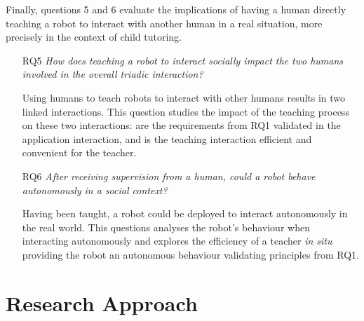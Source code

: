 Finally, questions 5 and 6 evaluate the implications of having a human directly teaching a robot to interact with another human in a real situation, more precisely in the context of child tutoring.
\begin{itemize}
	\item [RQ5] \emph{How does teaching a robot to interact socially impact the two humans involved in the overall triadic interaction?}

		Using humans to teach robots to interact with other humans results in two linked interactions. This question studies the impact of the teaching process on these two interactions: are the requirements from RQ1 validated in the application interaction, and is the teaching interaction efficient and convenient for the teacher.
		
    \item [RQ6] \emph{After receiving supervision from a human, could a robot behave autonomously in a social context?}

	 	Having been taught, a robot could be deployed to interact autonomously in the real world. This questions analyses the robot's behaviour when interacting autonomously and explores the efficiency of a teacher \textit{in situ} providing the robot an autonomous behaviour validating principles from RQ1.
	 
\end{itemize}

\section{Research Approach}

